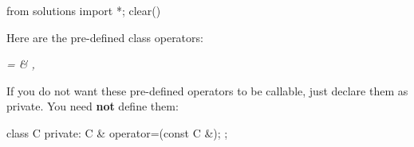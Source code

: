 \begin{python0}
from solutions import *; clear()
\end{python0}

Here are the pre-defined class operators:

\textit{= \& ,}

If you do not want these pre-defined operators to be callable, just
declare them as private. You need \textbf{not} define them:

\begin{consolethree}[escapeinside=||]
class C
{
private:
    C & operator=(const C &);
};
\end{consolethree}


